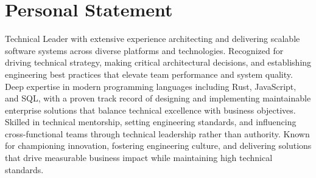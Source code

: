 %
\section{Personal Statement}
Technical Leader with extensive experience architecting and delivering
scalable software systems across diverse platforms and technologies. Recognized for
driving technical strategy, making critical architectural decisions, and establishing
engineering best practices that elevate team performance and system quality. Deep expertise
in modern programming languages including Rust, JavaScript, and SQL, with a proven track
record of designing and implementing maintainable enterprise solutions that balance
technical excellence with business objectives. Skilled in technical mentorship, setting
engineering standards, and influencing cross-functional teams through technical leadership
rather than authority. Known for championing innovation, fostering engineering culture,
and delivering solutions that drive measurable business impact while maintaining high
technical standards.
